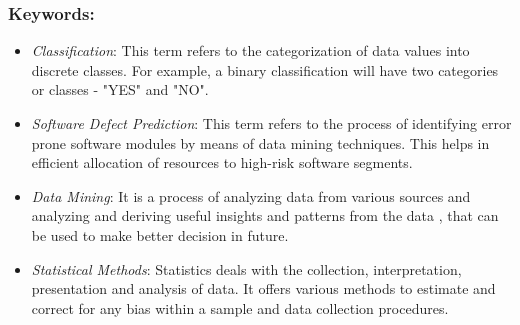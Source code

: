 \documentclass{sig-alternate-05-2015}
\begin{document}
\subsubsection{Keywords:}
\begin{itemize}
\item \emph{Classification}: This term refers to the categorization of data values into discrete classes. For example, a binary classification will have two categories or classes - "YES" and "NO".
\item \emph{Software Defect Prediction}: This term refers to the process of identifying error prone software modules by means of data mining techniques. This helps in efficient allocation of resources to high-risk software segments.
\item \emph{Data Mining}: It is a process of analyzing data from various sources and analyzing and deriving useful insights and patterns from the data , that can be used to make better decision in future.
\item \emph{Statistical Methods}: Statistics deals with the collection, interpretation, presentation and analysis of data. It offers various methods to estimate and correct for any bias within a sample and data collection procedures.
\end{itemize} 
\end{document}
